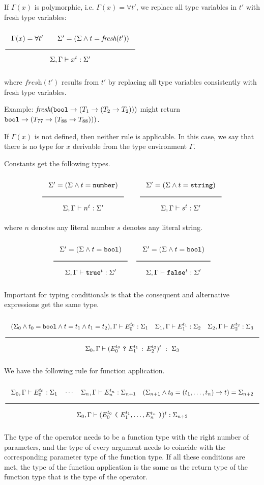 If $\Gamma(x)$ is polymorphic,  i.e. $\Gamma(x) = \forall t'$, we replace all type variables in
$t'$ with fresh type variables:

\noindent
$\Rule{\Gamma(x) = \forall t' \qquad
  \Sigma' = (\Sigma \wedge t = \textit{fresh}(t'))}{\Sigma, \Gamma \vdash x^t : \Sigma'}$

\noindent
where $\textit{fresh}(t')$ results from $t'$ by replacing all type variables consistently with
fresh type variables.

Example: $\textit{fresh}(\texttt{bool} \rightarrow (T_1 \rightarrow (T_2 \rightarrow T_2)))$
might return $\texttt{bool} \rightarrow (T_{77} \rightarrow (T_{88} \rightarrow T_{88})))$.

If $\Gamma(x)$ is not defined, then neither rule is applicable.
In this case, we say that
there is no type for $x$ derivable from the type environment $\Gamma$. 

Constants get the following types.

\noindent
\[
  \Rule{\Sigma' = (\Sigma \wedge t = \Number)}{\Sigma, \Gamma \vdash n^t : \Sigma'}
  \qquad
  \Rule{\Sigma' = (\Sigma \wedge t = \String)}{\Sigma, \Gamma \vdash s^t : \Sigma'}
\]
\noindent
where $n$ denotes any literal number $s$ denotes any literal string.

\noindent
\[
  \Rule{\Sigma' = (\Sigma \wedge t = \Bool)}{\Sigma, \Gamma \vdash \TruE^t : \Sigma'}
  \quad
  \Rule{\Sigma' = (\Sigma \wedge t = \Bool)}{\Sigma, \Gamma \vdash \FalsE^t : \Sigma'}  
\]

\noindent
Important for typing conditionals is that the consequent and alternative
expressions get the same type. 

\noindent
\[
  \Rule{(\Sigma_0 \wedge t_0 = \Bool \wedge t = t_1 \wedge t_1 = t_2),
  \Gamma \vdash E_0^{t_0} : \Sigma_1 \quad
  \Sigma_1, \Gamma \vdash E_1^{t_1} : \Sigma_2 \quad
  \Sigma_2, \Gamma \vdash E_2^{t_2} : \Sigma_3 }{
  \Sigma_0, \Gamma \vdash ( E_0^{t_0}\ \texttt{?}\ E_1^{t_1}\ \texttt{:}\ E_2^{t_2})^t\ :\ \Sigma_3}  
\]

We have the following rule for function application.

\[
\Rule{  \Sigma_0, \Gamma \vdash E_0^{t_0} : \Sigma_1 \quad
  \cdots \quad \Sigma_{n}, \Gamma \vdash E_{n}^{t_n} : \Sigma_{n+1} \quad
  (\Sigma_{n+1} \wedge t_0 = (t_1, \ldots, t_n) \rightarrow t) = \Sigma_{n+2}}{
  \Sigma_0, \Gamma \vdash (E_0^{t_0}\ \Lp \ E_1^{t_1}, \ldots, E_n^{t_n}\ \Rp)^t : \Sigma_{n+2}}  
\]

\noindent
The type of the operator needs to be a function type with the right
number of parameters, and the type of every argument needs to coincide
with the corresponding parameter type of the function type. If all these
conditions are met, the type of the function application is the same
as the return type of the function type that is the type of the operator.


